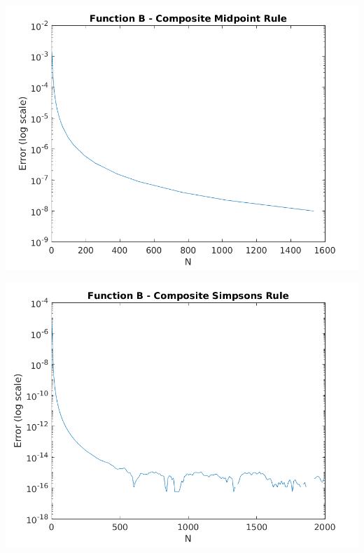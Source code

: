 \documentclass[a4paper]{article}
\begin{document}
\begin{center}
	\includegraphics[width=1\textwidth]{../output/b_midpoint.png}
	\label{fig:b_mid}
\end{center}


\begin{center}
	\includegraphics[width=1\textwidth]{../output/b_simpsons.png}
	\label{fig:b_sim}
\end{center}
\end{document}
